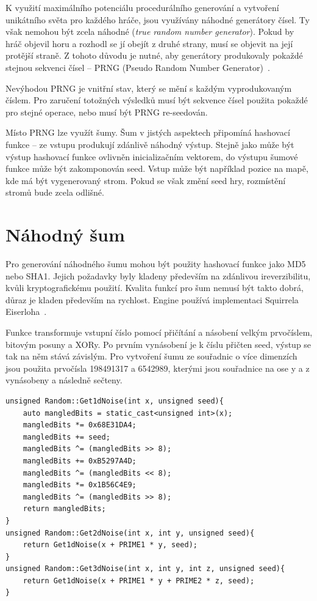 \documentclass[thesis=M,czech]{FITthesis}[2019/12/23]
\begin{document}
K využití maximálního potenciálu procedurálního generování a vytvoření unikátního světa pro každého hráče, jsou využívány náhodné generátory čísel. Ty však nemohou být zcela náhodné (\textit{true random number generator}). Pokud by hráč objevil horu a rozhodl se jí obejít z druhé strany, musí se objevit na její protější straně. Z tohoto důvodu je nutné, aby generátory produkovaly pokaždé stejnou sekvenci čísel – PRNG (Pseudo Random Number Generator)~\cite{prng}.

Nevýhodou PRNG je vnitřní stav, který se mění s každým vyprodukovaným číslem. Pro zaručení totožných výsledků musí být sekvence čísel použita pokaždé pro stejné operace, nebo musí být PRNG re-seedován.

Místo PRNG lze využít šumy. Šum v jistých aspektech připomíná hashovací funkce -- ze vstupu produkují zdánlivě náhodný výstup. Stejně jako může být výstup hashovací funkce ovlivněn inicializačním vektorem, do výstupu šumové funkce může být zakomponován seed. Vstup může být například pozice na mapě, kde má být vygenerovaný strom. Pokud se však změní seed hry, rozmístění stromů bude zcela odlišné.

\section{Náhodný šum}

Pro generování náhodného šumu mohou být použity hashovací funkce jako MD5 nebo SHA1. Jejich požadavky byly kladeny především na zdánlivou ireverzibilitu, kvůli kryptografickému použití. Kvalita funkcí pro šum nemusí být takto dobrá, důraz je kladen především na rychlost. Engine používá implementaci Squirrela Eiserloha~\cite{sqr_noise}.

Funkce transformuje vstupní číslo pomocí přičítání a násobení velkým prvočíslem, bitovým posuny a XORy. Po prvním vynásobení je k číslu přičten seed, výstup se tak na něm stává závislým. Pro vytvoření šumu ze souřadnic o více dimenzích jsou použita prvočísla 198491317 a 6542989, kterými jsou souřadnice na ose y a z vynásobeny a následně sečteny.

\begin{verbatim}
unsigned Random::Get1dNoise(int x, unsigned seed){
    auto mangledBits = static_cast<unsigned int>(x);
    mangledBits *= 0x68E31DA4;
    mangledBits += seed;
    mangledBits ^= (mangledBits >> 8);
    mangledBits += 0xB5297A4D;
    mangledBits ^= (mangledBits << 8);
    mangledBits *= 0x1B56C4E9;
    mangledBits ^= (mangledBits >> 8);
    return mangledBits;
}
unsigned Random::Get2dNoise(int x, int y, unsigned seed){
    return Get1dNoise(x + PRIME1 * y, seed);
}
unsigned Random::Get3dNoise(int x, int y, int z, unsigned seed){
    return Get1dNoise(x + PRIME1 * y + PRIME2 * z, seed);
}
\end{verbatim}
\end{document}

